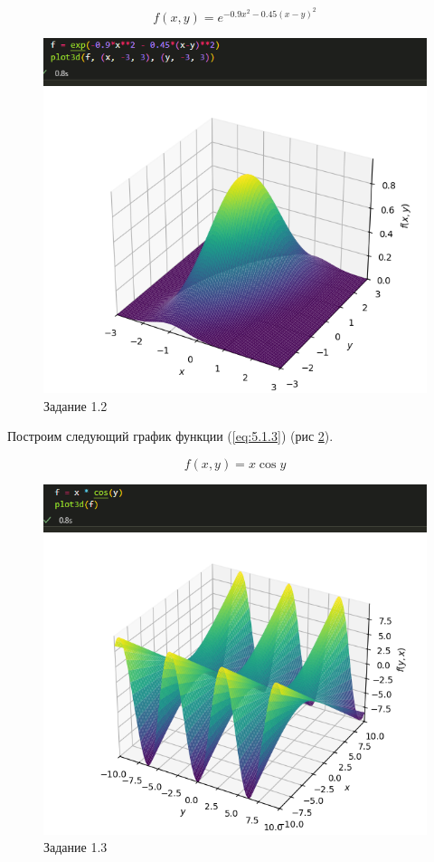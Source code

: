 \documentclass[14pt,a4paper]{extarticle}
\begin{document}
\begin{equation}
    \label{eq:5.1.2}
    f(x, y) = e ^ {-0.9x^2-0.45(x-y)^2}
\end{equation}
\begin{figure}
    [ht!]\centering
    \includegraphics[width=\linewidth]{figures/5.1/2.png}
    \caption{Задание 1.2}
    \label{pic:5.1.2}
\end{figure}
\newpage


Построим следующий график функции (\ref{eq:5.1.3}) (рис \ref{pic:5.1.3}).

\begin{equation}
    \label{eq:5.1.3}
    f(x, y) = x \cos{y}
\end{equation}

\begin{figure}
    [ht!]\centering
    \includegraphics[width=\linewidth]{figures/5.1/3.png}
    \caption{Задание 1.3}
    \label{pic:5.1.3}
\end{figure}
\newpage
\end{document}
